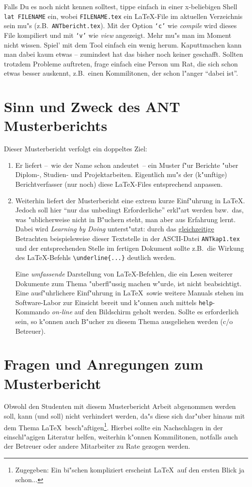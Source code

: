 Falls Du es noch nicht kennen 
solltest, tippe einfach in einer x-beliebigen Shell {\tt lat FILENAME} ein,
wobei {\tt FILENAME.tex} ein \LaTeX-File im aktuellen Verzeichnis sein mu"s
(z.B.\ {\tt ANTbericht.tex}).
Mit der Option {\tt `c'} wie {\em compile}\/ wird dieses File kompiliert 
und mit {\tt `v'} wie {\em view}\/ angezeigt. Mehr mu"s man im Moment nicht wissen.
Spiel' mit dem Tool einfach ein wenig herum. Kaputtmachen kann man dabei
kaum etwas -- zumindest hat das bisher noch keiner geschafft.
Sollten trotzdem Probleme auftreten, frage einfach eine Person um Rat, 
die sich schon etwas besser auskennt, z.B.\ einen Kommilitonen, der schon
l"anger ``dabei ist''.


\section{Sinn und Zweck des ANT Musterberichts}
%
Dieser Musterbericht verfolgt ein doppeltes Ziel:
%
\begin{enumerate}
\item Er liefert --~wie der Name schon andeutet~-- ein Muster f"ur Berichte "uber
      Diplom-, Studien- und Projektarbeiten. Eigentlich mu"s der (k"unftige)
      Berichtverfasser (nur noch) diese \LaTeX-Files entsprechend anpassen.
\item Weiterhin liefert der Musterbericht eine extrem kurze Einf"uhrung in \LaTeX.
      Jedoch soll hier ``nur das unbedingt Erforderliche'' erkl"art werden bzw.\ das,
      was "ublicherweise nicht in B"uchern steht, man aber aus Erfahrung lernt.
      Dabei wird {\em Learning by Doing} unterst"utzt: durch das
      \underline{gleichzeitige} Betrachten beispielsweise dieser Textstelle
      in der ASCII-Datei {\tt ANTkap1.tex} und der entsprechenden Stelle
      im fertigen Dokument sollte z.B.\ die Wirkung des \LaTeX-Befehls 
      \verb+\underline{...}+ deutlich werden.

Eine {\em umfassende} Darstellung von \LaTeX-Befehlen, die ein Lesen
weiterer Dokumente zum Thema "uberfl"ussig machen w"urde, ist nicht
beabsichtigt.
Eine ausf"uhrlichere Einf"uhrung in \LaTeX\ sowie weitere Manuals stehen im Software-Labor
zur Einsicht bereit und k"onnen auch mittels {\tt help}-Kommando {\em on-line}
auf den Bildschirm geholt werden. Sollte es erforderlich sein, so k"onnen auch
B"ucher zu diesem Thema ausgeliehen werden (c/o Betreuer).
\end{enumerate}


\section{Fragen und Anregungen zum Musterbericht}
%
Obwohl den Studenten mit diesem Musterbericht Arbeit abgenommen werden soll,
kann (und soll) nicht verhindert werden, da"s diese sich dar"uber hinaus 
mit dem Thema \LaTeX\ besch"aftigen\footnote{Zugegeben: 
Ein bi"schen kompliziert erscheint \LaTeX\ auf den ersten Blick ja
schon...}. Hierbei sollte ein Nachschlagen in der einschl"agigen
Literatur helfen, weiterhin k"onnen Kommilitonen, notfalls auch der
Betreuer oder andere Mitarbeiter zu Rate gezogen werden.

